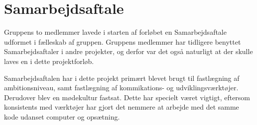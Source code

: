 \section{Samarbejdsaftale}

Gruppens to medlemmer lavede i starten af forløbet en Samarbejdsaftale udformet i fælleskab af gruppen. Gruppens medlemmer har tidligere benyttet Samarbejdsaftaler i andre projekter, og derfor var det også naturligt at der skulle laves en i dette projektforløb.

Samarbejdsaftalen har i dette projekt primært blevet brugt til fastlægning af ambitionsniveau, samt fastlægning af kommikations- og udviklingsværktøjer. Derudover blev en mødekultur fastsat. Dette har specielt været vigtigt, eftersom konsistents med værktøjer har gjort det nemmere at arbejde med det samme kode udanset computer og opsætning.
